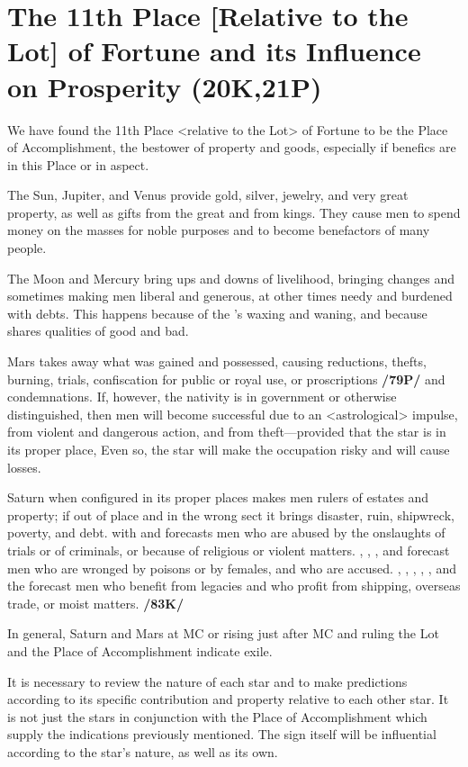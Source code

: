 \section{The 11th Place [Relative to the Lot] of Fortune and its Influence on Prosperity (20K,21P)}

We have found the 11th Place <relative to the Lot> of Fortune to be the Place of Accomplishment, the bestower of property and goods, especially if benefics are in this Place or in aspect. 

The Sun, Jupiter, and Venus provide gold, silver, jewelry, and very great property, as well as gifts from the great and from kings. They cause men to spend money on the masses for noble purposes and to become benefactors of many
people. 

The Moon and Mercury bring ups and downs of livelihood, bringing changes and sometimes making men liberal and generous, at other times needy and burdened with debts. This happens because of the \Moon’s waxing and waning, and because \Mercury\xspace shares qualities of good and bad. 

Mars takes away what was gained and possessed, causing reductions, thefts, burning, trials, confiscation for public or royal use, or proscriptions \textbf{/79P/} and condemnations. If, however, the nativity is in government or otherwise distinguished, then men will become successful due to an <astrological> impulse, from violent and dangerous action, and from theft—provided that the star is in its proper place, Even so, the star will make the occupation risky and will cause losses. 

Saturn when configured in its proper places makes men rulers of estates and property; if out of place and in the wrong sect it brings disaster, ruin, shipwreck, poverty, and
debt. \Saturn\xspace with \Mercury\xspace and \Mars\xspace forecasts men who are abused by the onslaughts of trials or of criminals, or because of religious or violent matters. \Saturn, \Mercury, \Mars, and \Venus forecast men who are wronged by poisons or by females, and who are accused. \Saturn, \Mars, \Mercury, \Venus, \Jupiter, and the \Moon\xspace forecast men who benefit from legacies and who profit from shipping, overseas trade, or moist matters. \textbf{/83K/}

In general, Saturn and Mars at MC or rising just after MC and ruling the Lot and the Place of Accomplishment indicate exile.

\mndl [0.2cm]
It is necessary to review the nature of each star and to make predictions according to its specific contribution and property relative to each other star. It is not just the stars in conjunction with the Place of Accomplishment which supply the indications previously mentioned. The sign itself will be influential according to the star’s nature, as well as its own.

\newpage